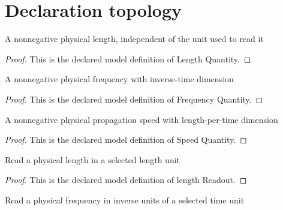 \section{Declaration topology}
\begin{definition}
  \label{def:physics:phyx-mini-0206:phyxminiproblems-problemphyxmini0206-lengthquantity}
  A nonnegative physical length, independent of the unit used to read it
\end{definition}
\begin{proof}
  This is the declared model definition of Length Quantity.
\end{proof}
\begin{definition}
  \label{def:physics:phyx-mini-0206:phyxminiproblems-problemphyxmini0206-frequencyquantity}
  A nonnegative physical frequency with inverse-time dimension
\end{definition}
\begin{proof}
  This is the declared model definition of Frequency Quantity.
\end{proof}
\begin{definition}
  \label{def:physics:phyx-mini-0206:phyxminiproblems-problemphyxmini0206-speedquantity}
  A nonnegative physical propagation speed with length-per-time dimension
\end{definition}
\begin{proof}
  This is the declared model definition of Speed Quantity.
\end{proof}
\begin{definition}
  \label{def:physics:phyx-mini-0206:phyxminiproblems-problemphyxmini0206-lengthreadout}
  Read a physical length in a selected length unit
\end{definition}
\begin{proof}
  This is the declared model definition of length Readout.
\end{proof}
\begin{definition}
  \label{def:physics:phyx-mini-0206:phyxminiproblems-problemphyxmini0206-frequencyreadout}
  Read a physical frequency in inverse units of a selected time unit
\end{definition}
